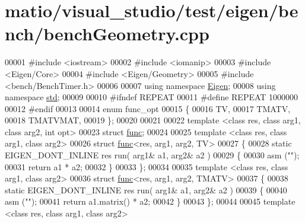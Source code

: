 \hypertarget{matio_2visual__studio_2test_2eigen_2bench_2bench_geometry_8cpp_source}{}\section{matio/visual\+\_\+studio/test/eigen/bench/bench\+Geometry.cpp}
\label{matio_2visual__studio_2test_2eigen_2bench_2bench_geometry_8cpp_source}

\begin{DoxyCode}
00001 \textcolor{preprocessor}{#include <iostream>}
00002 \textcolor{preprocessor}{#include <iomanip>}
00003 \textcolor{preprocessor}{#include <Eigen/Core>}
00004 \textcolor{preprocessor}{#include <Eigen/Geometry>}
00005 \textcolor{preprocessor}{#include <bench/BenchTimer.h>}
00006 
00007 \textcolor{keyword}{using namespace }\hyperlink{namespace_eigen}{Eigen};
00008 \textcolor{keyword}{using namespace }\hyperlink{namespacestd}{std};
00009 
00010 \textcolor{preprocessor}{#ifndef REPEAT}
00011 \textcolor{preprocessor}{#define REPEAT 1000000}
00012 \textcolor{preprocessor}{#endif}
00013 
00014 \textcolor{keyword}{enum} func\_opt
00015 \{
00016     TV,
00017     TMATV,
00018     TMATVMAT,
00019 \};
00020 
00021 
00022 \textcolor{keyword}{template} <\textcolor{keyword}{class} res, \textcolor{keyword}{class} arg1, \textcolor{keyword}{class} arg2, \textcolor{keywordtype}{int} opt>
00023 \textcolor{keyword}{struct }\hyperlink{structfunc}{func};
00024 
00025 \textcolor{keyword}{template} <\textcolor{keyword}{class} res, \textcolor{keyword}{class} arg1, \textcolor{keyword}{class} arg2>
00026 \textcolor{keyword}{struct }\hyperlink{structfunc}{func}<res, arg1, arg2, TV>
00027 \{
00028     \textcolor{keyword}{static} EIGEN\_DONT\_INLINE res run( arg1& a1, arg2& a2 )
00029     \{
00030     \textcolor{keyword}{asm} (\textcolor{stringliteral}{""});
00031     \textcolor{keywordflow}{return} a1 * a2;
00032     \}
00033 \};
00034 
00035 \textcolor{keyword}{template} <\textcolor{keyword}{class} res, \textcolor{keyword}{class} arg1, \textcolor{keyword}{class} arg2>
00036 \textcolor{keyword}{struct }\hyperlink{structfunc}{func}<res, arg1, arg2, TMATV>
00037 \{
00038     \textcolor{keyword}{static} EIGEN\_DONT\_INLINE res run( arg1& a1, arg2& a2 )
00039     \{
00040     \textcolor{keyword}{asm} (\textcolor{stringliteral}{""});
00041     \textcolor{keywordflow}{return} a1.matrix() * a2;
00042     \}
00043 \};
00044 
00045 \textcolor{keyword}{template} <\textcolor{keyword}{class} res, \textcolor{keyword}{class} arg1, \textcolor{keyword}{class} arg2>

\end{DoxyCode}
